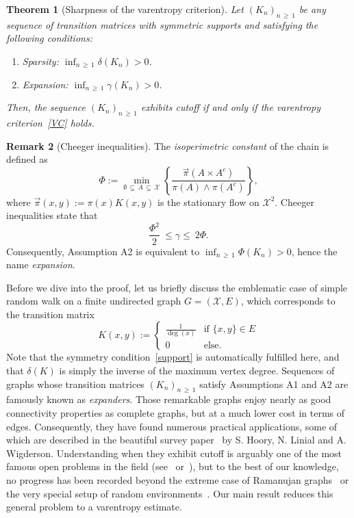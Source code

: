 \documentclass[10pt]{amsart}
\newtheorem{theo}{Theorem}[section]
\theoremstyle{definition}\newtheorem{defi}[theo]{Definition}\newtheorem{rema}[theo]{Remark}\newtheorem{exam}[theo]{Example}\newtheorem{exem}[theo]{Example}\newtheorem{nota}[theo]{Notation}
\newcommand{\cX}{\mathcal{X}}
\newcommand*{\Aenumi}{\renewcommand*{\theenumi}{A\arabic{enumi}}}
\begin{document}
\begin{theo}[Sharpness of the varentropy criterion]\label{th:main}
Let $(K_n)_{n\,\ge\,1}$ be any sequence of transition matrices with symmetric supports and satisfying the following conditions:
\begin{enumerate}\Aenumi
\item\label{A1} Sparsity: $\inf_{n\,\ge\,1}\delta(K_n)>0$.
\item\label{A2} Expansion: $\inf_{n\,\ge\,1}\gamma(K_n)>0$.
\end{enumerate}
Then, the sequence $(K_n)_{n\,\ge\,1}$ exhibits cutoff if and only if the varentropy criterion~\eqref{VC} holds.
\end{theo}


\begin{rema}[Cheeger inequalities] The \emph{isoperimetric constant} of the chain is defined as
\[
\Phi := \min_{\emptyset\,\subsetneq\,A\,\subsetneq\,\cX }\left\{\frac{\vec{\pi}(A\times A^c)}{\pi(A)\wedge \pi(A^c)}\right\},
\]
where $\vec{\pi}(x,y):=\pi(x)K(x,y)$ is the stationary flow on $\cX^2$. Cheeger inequalities state that
\[
\frac{\Phi^2}{2} \ \le \gamma \le \ 2\Phi.
\]
Consequently, Assumption A2 is equivalent to $\inf_{n\,\ge\,1}\Phi(K_n)>0$, hence the name \emph{expansion}.
\end{rema}

Before we dive into the proof, let us briefly discuss the emblematic case of simple random walk on a finite undirected graph $G=(\cX,E)$, which corresponds to the transition matrix
\begin{equation*}
K(x,y) := 
\begin{cases}
\frac{1}{\deg(x)} & \text{if }\{x,y\}\in E\\
0 & \text{else}.
\end{cases}
\end{equation*}
Note that the symmetry condition~\eqref{support} is automatically fulfilled here, and that $\delta(K)$ is simply the inverse of the maximum vertex degree. Sequences of graphs whose transition matrices $(K_n)_{n\,\ge\,1}$ satisfy Assumptions A1 and A2 are famously known as \emph{expanders}. Those remarkable graphs enjoy nearly as good connectivity properties as complete graphs, but at a much lower cost in terms of edges. Consequently, they have found numerous practical applications, some of which are described in the beautiful survey paper~\cite{MR2247919} by S. Hoory, N. Linial and A. Wigderson. Understanding when they exhibit cutoff is arguably one of the most famous open problems in the field (see~\cite[Open Question~34]{peresamerican} or~\cite[Question~5]{MR3726904}), but to the best of our knowledge, no progress has been recorded beyond the extreme case of {Ramanujan graphs}~\cite{MR4476123,MR3693771,MR3558308,MR4178418} or the very special setup of random environments~\cite{MR3773804,MR3916108,MR3650414,MR4132638,MR3758735,
MR4476123,
arxiv.2212.04469,MR4385126,MR2667423}. Our main result reduces this general problem to a varentropy estimate.
\end{document}
